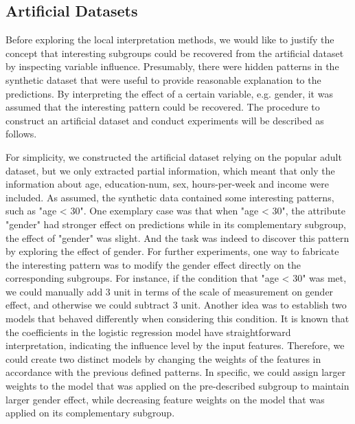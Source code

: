 
\subsection{Artificial Datasets} 

Before exploring the local interpretation methods, we would like to justify the concept that interesting subgroups could be recovered from the artificial dataset by inspecting variable influence. Presumably, there were hidden patterns in the synthetic dataset that were useful to provide reasonable explanation to the predictions. By interpreting the effect of a certain variable, e.g. gender, it was assumed that the interesting pattern could be recovered. The procedure to construct an artificial dataset and conduct experiments will be described as follows. 

For simplicity, we constructed the artificial dataset relying on the popular adult dataset, but we only extracted partial information, which meant that only the information about age, education-num, sex, hours-per-week and income were included. As assumed, the synthetic data contained some interesting patterns, such as "age < 30". One exemplary case was that when "age < 30", the attribute "gender" had stronger effect on predictions while in its complementary subgroup, the effect of "gender" was slight. And the task was indeed to discover this pattern by exploring the effect of gender. For further experiments, one way to fabricate the interesting pattern was to modify the gender effect directly on the corresponding subgroups. For instance, if the condition that "age < 30" was met, we could manually add 3 unit in terms of the scale of measurement on gender effect, and otherwise we could subtract 3 unit. Another idea was to establish two models that behaved differently when considering this condition. It is known that the coefficients in the logistic regression model have straightforward interpretation, indicating the influence level by the input features. Therefore, we could create two distinct models by changing the weights of the features in accordance with the previous defined patterns. In specific, we could assign larger weights to the model that was applied on the pre-described subgroup to maintain larger gender effect, while decreasing feature weights on the model that was applied on its complementary subgroup.

